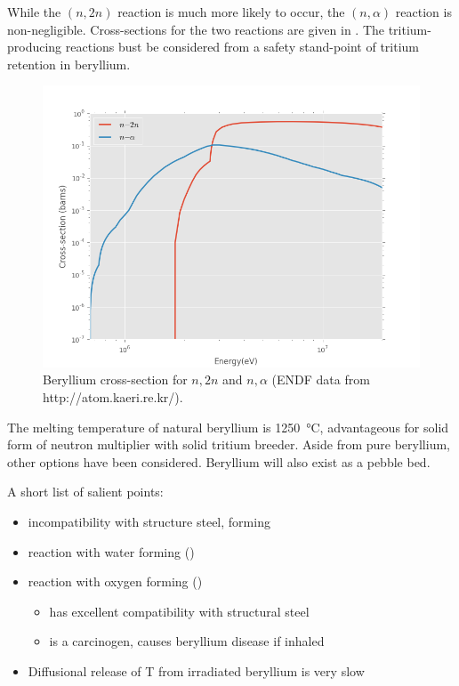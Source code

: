 \documentclass[11pt]{report} %
\begin{document}
While the $(n,2n)$ reaction is much more likely to occur, the $(n,\alpha)$ reaction is non-negligible. Cross-sections for the two reactions are given in . The tritium-producing reactions bust be considered from a safety stand-point of tritium retention in beryllium.

\begin{figure}[ht]
	\centering
	\includegraphics[width=\textwidth]{images/beryllium-xs} 
	\caption{Beryllium cross-section for $n,2n$ and $n,\alpha$ (ENDF data from http://atom.kaeri.re.kr/).}
	\label{fig:beryllium-xs}
\end{figure}

The melting temperature of natural beryllium is \SI{1250}{\celsius}, advantageous for solid form of neutron multiplier with solid tritium breeder. Aside from pure beryllium, other options have been considered. Beryllium will also exist as a pebble bed. 

A short list of salient points:
\begin{itemize}
\item{ incompatibility with structure steel, forming }
\item{ reaction with water forming  ()}
\item{ reaction with oxygen forming  ()}
\begin{itemize}
\item{ has excellent compatibility with structural steel}
\item{ is a carcinogen, causes beryllium disease if inhaled}
\end{itemize}
\item{Diffusional release of T from irradiated beryllium is very slow}
\end{itemize}
\end{document}
